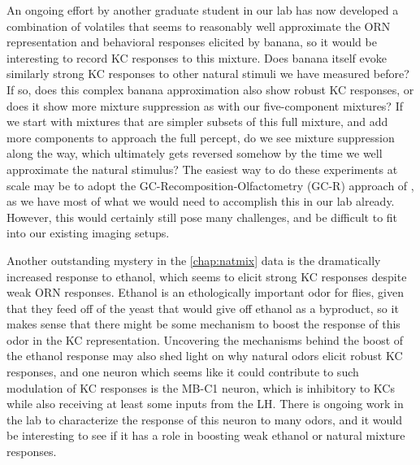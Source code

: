 \documentclass[12pt]{caltech_thesis}
\begin{document}
\begin{refsection}
An ongoing effort by another graduate student in our lab has now developed a combination of volatiles that seems to reasonably well approximate the ORN representation and behavioral responses elicited by banana, so it would be interesting to record KC responses to this mixture.
Does banana itself evoke similarly strong KC responses to other natural stimuli we have measured before?
If so, does this complex banana approximation also show robust KC responses, or does it show more mixture suppression as with our five-component mixtures?
If we start with mixtures that are simpler subsets of this full mixture, and add more components to approach the full percept, do we see mixture suppression along the way, which ultimately gets reversed somehow by the time we well approximate the natural stimulus?
The easiest way to do these experiments at scale may be to adopt the GC-Recomposition-Olfactometry (GC-R) approach of \textcite{GCRecombination1}, as we have most of what we would need to accomplish this in our lab already.
However, this would certainly still pose many challenges, and be difficult to fit into our existing imaging setups.

Another outstanding mystery in the \autoref{chap:natmix} data is the dramatically increased response to ethanol, which seems to elicit strong KC responses despite weak ORN responses.
Ethanol is an ethologically important odor for flies, given that they feed off of the yeast that would give off ethanol as a byproduct, so it makes sense that there might be some mechanism to boost the response of this odor in the KC representation.
Uncovering the mechanisms behind the boost of the ethanol response may also shed light on why natural odors elicit robust KC responses, and one neuron which seems like it could contribute to such modulation of KC responses is the MB-C1 neuron, which is inhibitory to KCs while also receiving at least some inputs from the LH.
There is ongoing work in the lab to characterize the response of this neuron to many odors, and it would be interesting to see if it has a role in boosting weak ethanol or natural mixture responses.

\ReferencesSection
\end{refsection}

\appendix
\end{document}
